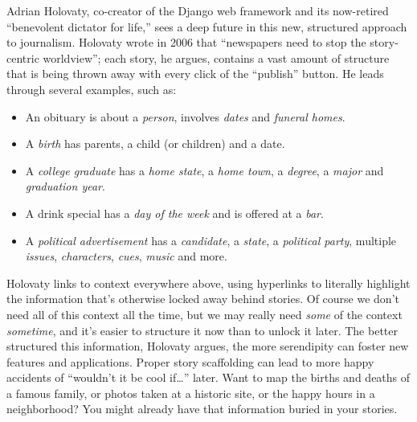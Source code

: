 Adrian Holovaty, co-creator of the Django web framework and its now-retired ``benevolent dictator for life,'' sees a deep future in this new, structured approach to journalism. Holovaty wrote in 2006 that ``newspapers need to stop the story-centric worldview''; each story, he argues, contains a vast amount of structure that is being thrown away with every click of the ``publish'' button.\autocite{holovaty_fundamental_2006} He leads through several examples, such as: \begin{itemize}
\item An obituary is about a \emph{person}, involves \emph{dates} and \emph{funeral homes}.
\item A \emph{birth} has parents, a child (or children) and a date.
\item A \emph{college graduate} has a \emph{home state}, a \emph{home town}, a \emph{degree}, a \emph{major} and \emph{graduation year}.
\item A drink special has a \emph{day of the week} and is offered at a \emph{bar}.
\item A \emph{political advertisement} has a \emph{candidate}, a \emph{state}, a \emph{political party}, multiple \emph{issues}, \emph{characters}, \emph{cues}, \emph{music} and more.\end{itemize}

\noindent Holovaty links to context everywhere above, using hyperlinks to literally highlight the information that's otherwise locked away behind stories. Of course we don't need all of this context all the time, but we may really need \emph{some} of the context \emph{sometime}, and it's easier to structure it now than to unlock it later. The better structured this information, Holovaty argues, the more serendipity can foster new features and applications. Proper story scaffolding can lead to more happy accidents of ``wouldn't it be cool if\ldots'' later. Want to map the births and deaths of a famous family, or photos taken at a historic site, or the happy hours in a neighborhood? You might already have that information buried in your stories.

